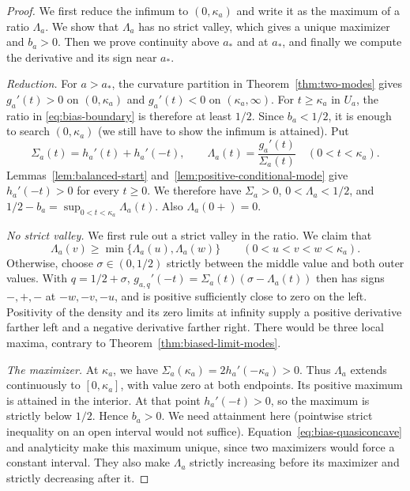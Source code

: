 \begin{proof}
We first reduce the infimum to $(0,\kappa_a)$ and write it as the
maximum of a ratio $\Lambda_a$. We show that $\Lambda_a$ has no strict
valley, which gives a unique maximizer and $b_a>0$. Then we prove
continuity above $a_*$ and at $a_*$, and finally we compute the
derivative and its sign near $a_*$.

\emph{Reduction.} For $a>a_*$, the curvature partition in Theorem~\ref{thm:two-modes}
gives $g_a'(t)>0$ on $(0,\kappa_a)$ and $g_a'(t)<0$ on
$(\kappa_a,\infty)$. For $t\ge\kappa_a$ in $U_a$, the ratio in
\eqref{eq:bias-boundary} is therefore at least $1/2$.
Since $b_a<1/2$, it is enough to search $(0,\kappa_a)$
(we still have to show the infimum is attained).
Put
\[
 \Sigma_a(t)=h_a'(t)+h_a'(-t),\qquad
 \Lambda_a(t)=\frac{g_a'(t)}{\Sigma_a(t)}\quad(0<t<\kappa_a).
\]
Lemmas~\ref{lem:balanced-start} and~\ref{lem:positive-conditional-mode}
give $h_a'(-t)>0$ for every $t\ge0$.
We therefore have $\Sigma_a>0$, $0<\Lambda_a<1/2$, and
$1/2-b_a=\sup_{0<t<\kappa_a}\Lambda_a(t)$. Also $\Lambda_a(0+)=0$.

\emph{No strict valley.} We first rule out a strict valley in the ratio. We claim that
\begin{equation}\label{eq:bias-quasiconcave}
 \Lambda_a(v)\ge\min\{\Lambda_a(u),\Lambda_a(w)\}
 \qquad(0<u<v<w<\kappa_a).
\end{equation}
Otherwise, choose $\sigma\in(0,1/2)$ strictly between the middle value
and both outer values. With $q=1/2+\sigma$,
$g_{a,q}'(-t)=\Sigma_a(t)(\sigma-\Lambda_a(t))$ then has signs $-,+,-$
at $-w,-v,-u$, and is positive sufficiently close to zero on the left.
Positivity of the density
and its zero limits at infinity supply a positive derivative farther
left and a negative derivative farther right. There would be three
local maxima, contrary to Theorem~\ref{thm:biased-limit-modes}.

\emph{The maximizer.} At $\kappa_a$, we have $\Sigma_a(\kappa_a)=2h_a'(-\kappa_a)>0$.
Thus $\Lambda_a$ extends continuously to $[0,\kappa_a]$, with value
zero at both endpoints. Its positive maximum is attained in the
interior. At that point $h_a'(-t)>0$, so the maximum is strictly
below $1/2$. Hence $b_a>0$. We need attainment here (pointwise strict
inequality on an open interval would not suffice).
Equation~\eqref{eq:bias-quasiconcave} and analyticity make this
maximum unique, since two maximizers would force a constant interval.
They also make $\Lambda_a$ strictly increasing before its maximizer and
strictly decreasing after it.


\end{proof}
